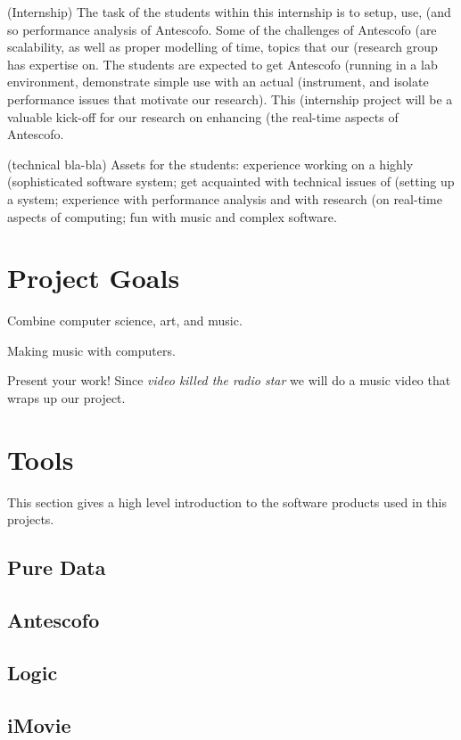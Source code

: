 \documentclass[onecolumn,nocopyrightspace,preprint]{sigplanconf}
\begin{document}
(Internship) The task of the students within this internship is to setup, use,
(and so performance analysis of Antescofo. Some of the challenges of Antescofo
(are scalability, as well as proper modelling of time, topics that our
(research group has expertise on. The students are expected to get Antescofo
(running in a lab environment, demonstrate simple use with an actual
(instrument, and isolate performance issues that motivate our research). This
(internship project will be a valuable kick-off for our research on enhancing
(the real-time aspects of Antescofo.

(technical bla-bla) Assets for the students: experience working on a highly
(sophisticated software system; get acquainted with technical issues of
(setting up a system; experience with performance analysis and with research
(on real-time aspects of computing; fun with music and complex software.



\section{Project Goals}

Combine computer science, art, and music.


Making music with computers.

Present your work! Since \textit{video killed the radio star} we will do a music video
that wraps up our project.



\section{Tools}
This section gives a high level introduction to the software products
used in this projects.

\subsection{Pure Data}

\subsection{Antescofo}

\subsection{Logic}

\subsection{iMovie}
\end{document}
